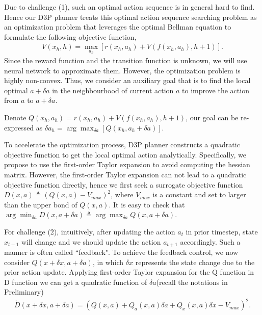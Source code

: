 \documentclass{article}
\newcommand{\vmax}{V_{max}}
\newcommand{\lijun}[1]{ {#1}}
\newcommand{\yue}[1]{ {#1}}
\begin{document}
Due to challenge (1), such an optimal action sequence is in general hard to find. Hence our D3P planner treats this optimal action sequence searching problem as an optimization problem that leverages the optimal Bellman equation to formulate the following objective function,
\begin{align}
\label{eqn:obe}
    V(x_h, h) = \max_{a_h}[r(x_h, a_h) + V(f(x_h, a_h), h+1)].
\end{align}
Since the reward function and the transition function is unknown, we will use neural network to approximate them. However, the optimization problem is highly non-convex. Thus, we consider an auxiliary goal that is to find the local optimal $a + \delta a$ in the neighbourhood of current action $a$ to improve the action from $a$ to $a+\delta a$.

Denote $Q(x_h, a_h) =  r(x_h, a_h) + V(f(x_h, a_h), h+1)$, our goal can be re-expressed as $\lijun{\delta a_h} = \arg\max_{\delta a}\left[ Q(x_h, a_h+\delta a) \right]$.

To accelerate the optimization process, D3P planner constructs a quadratic objective function to get the local optimal action analytically. 
\yue{Specifically, we propose to use the first-order Taylor expansion to avoid computing the hessian matrix. However, the first-order Taylor expansion can not lead to a quadratic objective function directly, hence we first seek a surrogate objective function $D(x,a) \triangleq \left( Q(x,a) -  \vmax \right)^2$, where $\vmax$ is a constant and set to larger than the upper bond of $Q(x,a)$.  It is easy to check that $\arg\min_{\delta a} D(x,a+\delta a) \triangleq \arg\max_{\delta a} Q(x,a + \delta a)$. }

For  challenge (2), intuitively, after updating the action $a_t$ in prior timestep, state $x_{t+1}$ will change and we should update the action $a_{t+1}$ accordingly. Such a manner is often called ``feedback". To achieve the feedback control, we now consider $Q(x+\delta x, a+\delta a)$, in which $\delta x $ represents the state change due to the prior action update.
Applying first-order Taylor expansion for the Q function in D function we can get a quadratic function of $\delta a$(recall the notations in Preliminary)
\begin{align}
    \tilde{D}(x +\delta x,a+\delta a) = (Q(x,a) + Q_a(x,a)\delta a + Q_x(x,a)\delta x - \vmax)^2.
\end{align}
\end{document}

